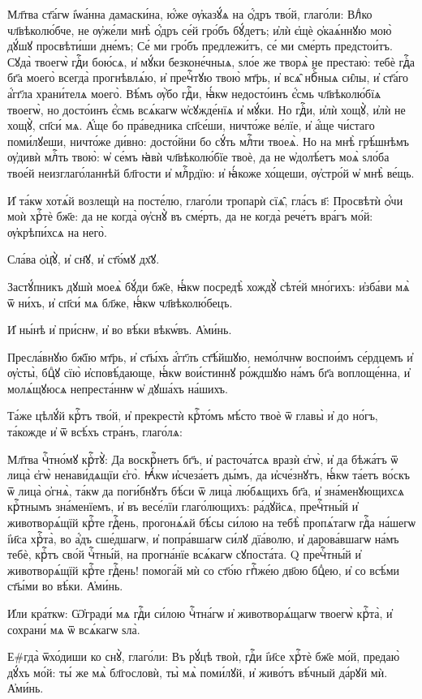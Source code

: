 \documentclass[20pt]{extarticle}
\begin{document}
Мл҃тва ст҃а́гѡ і҆ѡа́нна дамаски́на,
ю҆́же ѹ҆казꙋ́ѧ на ѻ҆́дръ тво́й, глаго́ли:
Влⷣко чл҃вѣколю́бче, не ѹ҆же́ли мнѣ̀ ѻ҆́дръ се́й гро́бъ бꙋ́детъ; и҆лѝ є҆щѐ ѻ҆каѧ́ннꙋю мою̀ дꙋ́шꙋ просвѣти́ши дне́мъ; Се́ ми гро́бъ предлежи́тъ, се́ ми сме́рть предстои́тъ. Сꙋда̀ твоегѡ̀ гдⷭ҇и бою́сѧ, и҆ мꙋ́ки безконе́чныѧ, ѕло́е же творѧ̀ не престаю̀: тебѐ гдⷭ҇а бг҃а моего̀ всегда̀ прогнѣвлѧ́ю, и҆ пречⷭ҇тꙋю твою̀ мт҃рь, и҆ всѧ̑ нбⷭ҇ныѧ си̑лы, и҆ ст҃а́го а҆́гг҃ла храни́телѧ моего̀. Вѣ́мъ ѹ҆̀бо гдⷭ҇и, ꙗ҆́кѡ недосто́инъ є҆́смь чл҃вѣколю́бїѧ твоегѡ̀, но досто́инъ є҆́смь всѧ́кагѡ ѡ҆сꙋжде́нїѧ и҆ мꙋ́ки. Но гдⷭ҇и, и҆лѝ хощꙋ̀, и҆лѝ не хощꙋ̀, сп҃си́ мѧ. А҆́ще бо пра́ведника сп҃се́ши, ничто́же ве́лїе, и҆ а҆́ще чи́стаго поми́лꙋеши, ничто́же ди́вно: досто́йни бо сꙋ́ть млⷭ҇ти твоеѧ̀. Но на мнѣ̀ грѣ́шнѣмъ ѹ҆дивѝ млⷭ҇ть твою̀: ѡ҆ се́мъ ꙗ҆вѝ чл҃вѣколю́бїе твоѐ, да не ѡ҆долѣ́етъ моѧ̀ ѕло́ба твое́й неизглаго́ланнѣй бл҃гости и҆ млⷭ҇рдїю: и҆ ꙗ҆́коже хо́щеши, ѹ҆стро́й ѡ҆ мнѣ̀ ве́щь.

И҆ та́кѡ хотѧ́й возлещѝ на посте́лю,
глаго́ли тропарѝ сїѧ̑, гла́съ в҃:
Просвѣтѝ ѻ҆́чи моѝ хрⷭ҇тѐ бж҃е: да не когда̀ ѹ҆снꙋ̀ въ сме́рть, да не когда̀ рече́тъ вра́гъ мо́й: ѹ҆крѣпи́хсѧ на него̀.

Сла́ва ѻ҆ц҃ꙋ̀, и҆ сн҃ꙋ, и҆ ст҃о́мꙋ дх҃ꙋ.

Застꙋ́пникъ дꙋшѝ моеѧ̀ бꙋ́ди бж҃е, ꙗ҆́кѡ посредѣ̀ хождꙋ̀ сѣте́й мно́гихъ: и҆зба́ви мѧ̀ ѿ ни́хъ, и҆ сп҃си́ мѧ бл҃же, ꙗ҆́кѡ чл҃вѣколю́бецъ.

И҆ ны́нѣ и҆ при́снѡ, и҆ во вѣ́ки вѣкѡ́въ. А҆ми́нь.

Пресла́внꙋю бж҃їю мт҃рь, и҆ ст҃ы́хъ а҆́гг҃лъ ст҃ѣ́йшꙋю, немо́лчнѡ воспои́мъ се́рдцемъ и҆ ѹ҆сты̀, бцⷣꙋ сїю̀ и҆сповѣ́дающе, ꙗ҆́кѡ вои́стиннꙋ ро́ждшꙋю на́мъ бг҃а воплоще́нна, и҆ молѧ́щꙋюсѧ непреста́ннѡ ѡ҆ дꙋша́хъ на́шихъ.

Та́же цѣлꙋ́й крⷭ҇тъ тво́й, и҆ прекрестѝ крⷭ҇то́мъ мѣ́сто твоѐ ѿ главы̀ и҆ до но́гъ, та́кожде и҆ ѿ всѣ́хъ стра́нъ, глаго́лѧ:

Мл҃тва чⷭ҇тно́мꙋ крⷭ҇тꙋ̀:
Да воскрⷭ҇нетъ бг҃ъ, и҆ расточа́тсѧ вразѝ є҆гѡ̀, и҆ да бѣжа́тъ ѿ лица̀ є҆гѡ̀ ненави́дѧщїи є҆го̀. Ꙗ҆́кѡ и҆счеза́етъ ды́мъ, да и҆сче́знꙋтъ, ꙗ҆́кѡ та́етъ во́скъ ѿ лица̀ ѻ҆гнѧ̀, та́кѡ да поги́бнꙋтъ бѣ́си ѿ лица̀ лю́бѧщихъ бг҃а, и҆ зна́менꙋющихсѧ крⷭ҇тнымъ зна́менїемъ, и҆ въ весе́лїи глаго́лющихъ: ра́дꙋйсѧ, пречⷭ҇тны́й и҆ животворѧ́щїй крⷭ҇те гдⷭ҇ень, прогонѧ́ѧй бѣ́сы си́лою на тебѣ̀ пропѧ́тагѡ гдⷭ҇а на́шегѡ і҆и҃са хрⷭ҇та̀, во а҆́дъ сше́дшагѡ, и҆ попра́вшагѡ си́лꙋ дїа́волю, и҆ дарова́вшагѡ на́мъ тебѐ, крⷭ҇тъ сво́й чⷭ҇тны́й, на прогна́нїе всѧ́кагѡ сꙋпоста́та. Q пречⷭ҇тны́й и҆ животворѧ́щїй крⷭ҇те гдⷭ҇ень! помога́й мѝ со ст҃о́ю гпⷭ҇же́ю дв҃ою бцⷣею, и҆ со всѣ́ми ст҃ы́ми во вѣ́ки. А҆ми́нь.

И҆ли кра́ткѡ:
Ѡ҆гради́ мѧ гдⷭ҇и си́лою чⷭ҇тна́гѡ и҆ животворѧ́щагѡ твоегѡ̀ крⷭ҇та̀, и҆ сохрани́ мѧ ѿ всѧ́кагѡ ѕла̀.

Е\#гда̀ ѿхо́диши ко снꙋ̀, глаго́ли:
Въ рꙋ́цѣ твоѝ, гдⷭ҇и і҆и҃се хрⷭ҇тѐ бж҃е мо́й, предаю̀ дꙋ́хъ мо́й: ты́ же мѧ̀ бл҃гословѝ, ты̀ мѧ̀ поми́лꙋй, и҆ живо́тъ вѣ́чный да́рꙋй мѝ. А҆ми́нь.
\end{document}
